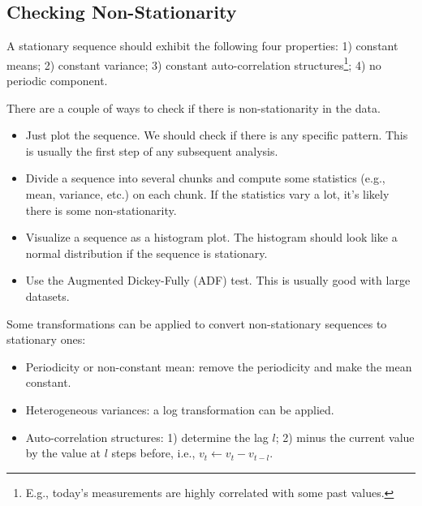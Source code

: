 


\subsection{Checking Non-Stationarity}
A stationary sequence should exhibit the following four properties: 1) constant means; 2) constant variance; 3) constant auto-correlation structures\footnote{E.g., today's measurements are highly correlated with some past values.}; 4) no periodic component. 

There are a couple of ways to check if there is non-stationarity in the data.
    \begin{itemize}
        \item Just plot the sequence. We should check if there is any specific pattern. 
        This is usually the first step of any subsequent analysis.
        \item Divide a sequence into several chunks and compute some statistics (e.g., mean, variance, etc.) on each chunk. 
        If the statistics vary a lot, it's likely there is some non-stationarity. 
        \item Visualize a sequence as a histogram plot. The histogram should look like a normal distribution if the sequence is stationary.
        \item Use the Augmented Dickey-Fully (ADF) test. This is usually good with large datasets.
    \end{itemize}

Some transformations can be applied to convert non-stationary sequences to stationary ones:
    \begin{itemize}
        \item Periodicity or non-constant mean: remove the periodicity and make the mean constant.
        \item Heterogeneous variances: a log transformation can be applied.
        \item Auto-correlation structures: 1) determine the lag $l$; 2) minus the current value by the value at $l$ steps before, i.e., $v_t \leftarrow v_t - v_{t-l}$.
    \end{itemize}